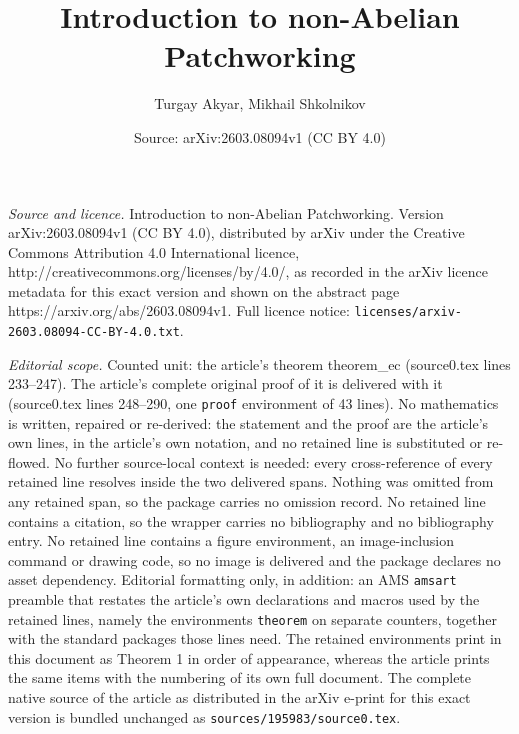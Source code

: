 \documentclass[10pt,a4paper]{amsart}
\title{Introduction to non-Abelian Patchworking}
\author{Turgay Akyar, Mikhail Shkolnikov}
\date{Source: arXiv:2603.08094v1 (CC BY 4.0)}
\begin{document}
\maketitle

\noindent\emph{Source and licence.} Introduction to non-Abelian Patchworking. Version arXiv:2603.08094v1 (CC BY 4.0), distributed by arXiv under the Creative Commons Attribution 4.0 International licence, http://creativecommons.org/licenses/by/4.0/, as recorded in the arXiv licence metadata for this exact version and shown on the abstract page https://arxiv.org/abs/2603.08094v1. Full licence notice: \texttt{licenses/arxiv-2603.08094-CC-BY-4.0.txt}.\par\smallskip

\noindent\textit{Editorial scope.} Counted unit: the article's theorem theorem\_ec (source0.tex lines 233--247). The article's complete original proof of it is delivered with it (source0.tex lines 248--290, one \texttt{proof} environment of 43 lines). No mathematics is written, repaired or re-derived: the statement and the proof are the article's own lines, in the article's own notation, and no retained line is substituted or re-flowed.  No further source-local context is needed: every cross-reference of every retained line resolves inside the two delivered spans.  Nothing was omitted from any retained span, so the package carries no omission record.  No retained line contains a citation, so the wrapper carries no bibliography and no bibliography entry.  No retained line contains a figure environment, an image-inclusion command or drawing code, so no image is delivered and the package declares no asset dependency.  Editorial formatting only, in addition: an AMS \texttt{amsart} preamble that restates the article's own declarations and macros used by the retained lines, namely the environments \texttt{theorem} on separate counters, together with the standard packages those lines need.  The retained environments print in this document as Theorem 1 in order of appearance, whereas the article prints the same items with the numbering of its own full document.  The complete native source of the article as distributed in the arXiv e-print for this exact version is bundled unchanged as \texttt{sources/195983/source0.tex}.
\end{document}
